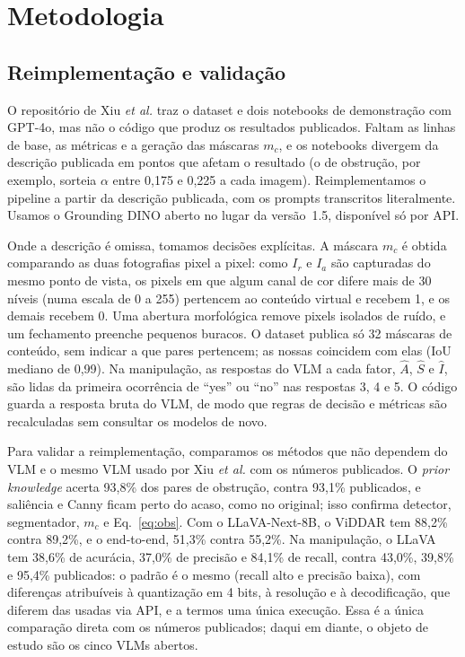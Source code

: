 \documentclass[conference]{IEEEtran}
\newcommand{\Ir}{I_r}
\newcommand{\Ia}{I_a}
\begin{document}
\section{Metodologia}
\label{sec:metodo}

\subsection{Reimplementação e validação}
\label{sec:reconstrucao}
O repositório de Xiu \emph{et al.} traz o dataset e dois notebooks de demonstração com GPT-4o, mas não o
código que produz os resultados publicados. Faltam as linhas de base, as métricas e a geração das
máscaras $m_c$, e os notebooks divergem da descrição publicada em pontos que afetam o resultado (o de obstrução, por
exemplo, sorteia $\alpha$ entre 0,175 e 0,225 a cada imagem). Reimplementamos o pipeline a partir da
descrição publicada, com os prompts transcritos literalmente. Usamos o Grounding DINO aberto no lugar da
versão~1.5, disponível só por API.

Onde a descrição é omissa, tomamos decisões explícitas. A máscara $m_c$ é obtida comparando as duas
fotografias pixel a pixel: como $\Ir$ e $\Ia$ são capturadas do mesmo ponto de vista, os pixels em que
algum canal de cor difere mais de 30 níveis (numa escala de 0 a 255) pertencem ao conteúdo virtual e
recebem 1, e os demais recebem 0. Uma abertura morfológica remove pixels isolados de ruído, e um
fechamento preenche pequenos buracos. O dataset publica só 32 máscaras de conteúdo, sem indicar a que
pares pertencem; as nossas coincidem com elas (IoU mediano de 0,99). Na manipulação, as respostas do VLM
a cada fator, $\hat A$, $\hat S$ e $\hat I$, são lidas da primeira ocorrência de ``yes'' ou ``no'' nas
respostas 3, 4 e 5. O código guarda a resposta bruta do VLM, de modo que regras de decisão e métricas são
recalculadas sem consultar os modelos de novo.

Para validar a reimplementação, comparamos os métodos que não dependem do VLM e o mesmo VLM usado por Xiu \emph{et al.}
com os números publicados. O \emph{prior knowledge} acerta 93,8\% dos pares de obstrução, contra 93,1\%
publicados, e saliência e Canny ficam perto do acaso, como no original; isso confirma detector,
segmentador, $m_c$ e Eq.~\eqref{eq:obs}. Com o LLaVA-Next-8B, o ViDDAR tem 88,2\% contra 89,2\%, e o
end-to-end, 51,3\% contra 55,2\%. Na manipulação, o LLaVA tem 38,6\% de acurácia, 37,0\% de precisão e
84,1\% de recall, contra 43,0\%, 39,8\% e 95,4\% publicados: o padrão é o mesmo (recall alto e precisão
baixa), com diferenças atribuíveis à quantização em 4 bits, à resolução e à decodificação, que diferem
das usadas via API, e a termos uma única execução. Essa é a única comparação direta com os números
publicados; daqui em diante, o objeto de estudo são os cinco VLMs abertos.
\end{document}
